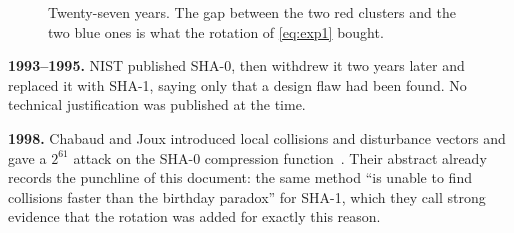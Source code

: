 \documentclass[11pt,a4paper]{article}
\begin{document}
\begin{figure}[h]
\centering
{}
\caption{Twenty-seven years. The gap between the two red clusters and the two
blue ones is what the rotation of \eqref{eq:exp1} bought.}
\label{fig:timeline}
\end{figure}

\textbf{1993--1995.} NIST published SHA-0, then withdrew it two years later
and replaced it with SHA-1, saying only that a design flaw had been found. No
technical justification was published at the time.

\textbf{1998.} Chabaud and Joux introduced local collisions and disturbance
vectors and gave a $2^{61}$ attack on the SHA-0 compression
function~\cite{chabaud1998}. Their abstract already records the punchline of
this document: the same method ``is unable to find collisions faster than the
birthday paradox'' for SHA-1, which they call strong evidence that the
rotation was added for exactly this reason.
\end{document}
